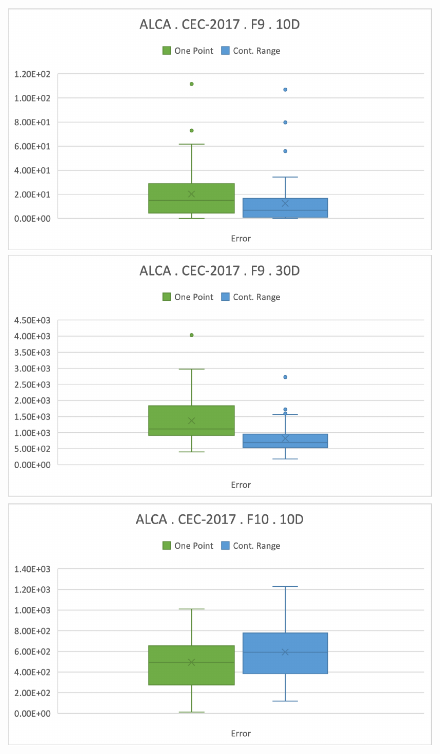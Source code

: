 \documentclass[graybox]{svmult}
\begin{document}
\begin{figure}[!ht]
\begin{minipage}[h]{0.49\linewidth}
        \end{minipage}
        \vfill
        \vspace{0.05 cm}
        \begin{minipage}[h]{0.49\linewidth}
            \includegraphics[width=1\linewidth]{img/fig_experiment_F9x10D.pdf} 
        \end{minipage}
        \hfill
        \vspace{0.05 cm}
        \begin{minipage}[h]{0.49\linewidth}
            \includegraphics[width=1\linewidth]{img/fig_experiment_F9x30D.pdf} 
        \end{minipage}
        \vfill
        \vspace{0.05 cm}
        \begin{minipage}[h]{0.49\linewidth}
            \includegraphics[width=1\linewidth]{img/fig_experiment_F10x10D.pdf} 

\end{minipage}
\end{figure}
\end{document}
